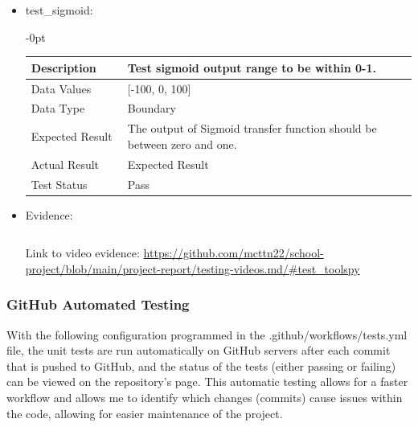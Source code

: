 \documentclass[./project-report/src/latex/project-report.tex]{subfiles}
\begin{document}
\begin{itemize}
\begin{itemize}
\begin{itemize}
					\item test\_sigmoid: \newline
					\begin{adjustwidth}{-\leftmargin}{0pt}
					\begin{tabular}{|p{0.25\linewidth}|p{0.75\linewidth}|}
						\hline
						Description & Test sigmoid output range to be within 0-1. \\
						\hline
						Data Values & [-100, 0, 100] \\
						\hline
						Data Type & Boundary \\
						\hline
						Expected Result & The output of Sigmoid transfer function should be between zero and one. \\
						\hline
						Actual Result & Expected Result \\
						\hline
						Test Status & Pass \\
						\hline
					\end{tabular}
					\end{adjustwidth}

					\vspace{5mm}

					\item Evidence:
                		\inputminted{python}{./school_project/test/models/cpu/utils/test_tools.py}

						\pagebreak

						\begin{figure}[h!]
						\centering
						\end{figure}
	
						Link to video evidence: \url{https://github.com/mcttn22/school-project/blob/main/project-report/testing-videos.md/#test_toolspy}
				\end{itemize}
        \end{itemize}
\end{itemize}

\subsubsection{GitHub Automated Testing}

With the following configuration programmed in the .github/workflows/tests.yml file, the unit tests are run automatically on GitHub servers after each commit that is pushed to GitHub, 
and the status of the tests (either passing or failing) can be viewed on the repository's page. This automatic testing allows for a faster workflow and allows me to identify which changes 
(commits) cause issues within the code, allowing for easier maintenance of the project.
\end{document}
